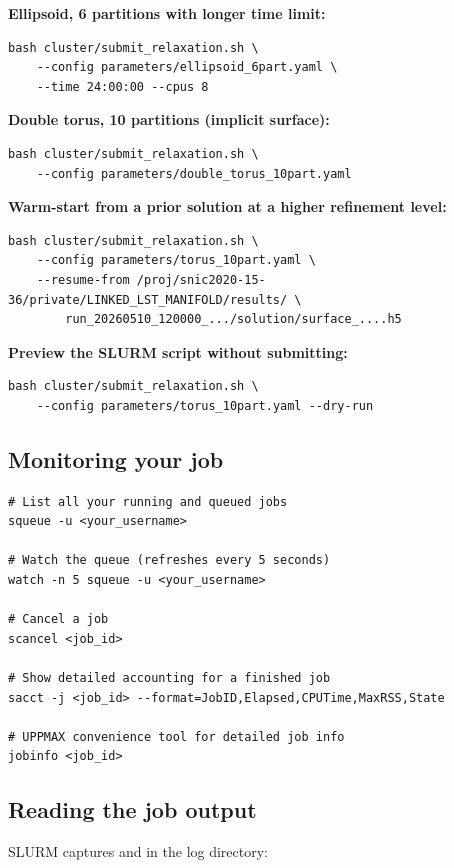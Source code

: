 \documentclass[11pt,a4paper]{article}
\begin{document}
\textbf{Ellipsoid, 6 partitions with longer time limit:}
\begin{lstlisting}[style=shell]
bash cluster/submit_relaxation.sh \
    --config parameters/ellipsoid_6part.yaml \
    --time 24:00:00 --cpus 8
\end{lstlisting}

\textbf{Double torus, 10 partitions (implicit surface):}
\begin{lstlisting}[style=shell]
bash cluster/submit_relaxation.sh \
    --config parameters/double_torus_10part.yaml
\end{lstlisting}

\textbf{Warm-start from a prior solution at a higher refinement level:}
\begin{lstlisting}[style=shell]
bash cluster/submit_relaxation.sh \
    --config parameters/torus_10part.yaml \
    --resume-from /proj/snic2020-15-36/private/LINKED_LST_MANIFOLD/results/ \
        run_20260510_120000_.../solution/surface_....h5
\end{lstlisting}

\textbf{Preview the SLURM script without submitting:}
\begin{lstlisting}[style=shell]
bash cluster/submit_relaxation.sh \
    --config parameters/torus_10part.yaml --dry-run
\end{lstlisting}

\subsection{Monitoring your job}

\begin{lstlisting}[style=shell]
# List all your running and queued jobs
squeue -u <your_username>

# Watch the queue (refreshes every 5 seconds)
watch -n 5 squeue -u <your_username>

# Cancel a job
scancel <job_id>

# Show detailed accounting for a finished job
sacct -j <job_id> --format=JobID,Elapsed,CPUTime,MaxRSS,State

# UPPMAX convenience tool for detailed job info
jobinfo <job_id>
\end{lstlisting}

\subsection{Reading the job output}

SLURM captures  and  in the log directory:
\end{document}
